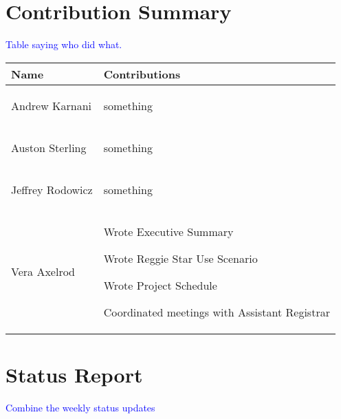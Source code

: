 \documentclass[11pt]{article}
\newenvironment{packed_itemize}{
\begin{itemize}
  \setlength{\itemsep}{1pt}
  \setlength{\parskip}{0pt}
  \setlength{\parsep}{0pt}
}{\end{itemize}}
\begin{document}
\section{Contribution Summary} %
\textcolor{blue}{Table saying who did what.}

\begin{table}
\centering %
\begin{tabular}{|p{1.4in}|p{4in}|}
\hline
\textbf{Name}     & \textbf{Contributions} \\
\hline\hline
 Andrew Karnani
	& 
	 \begin{packed_itemize} 
	\vspace{-0.15in}
		\item something
	\end{packed_itemize}
	\vspace{-0.4in}
\\
\hline
 Auston Sterling
	& 
	 \begin{packed_itemize} 
	\vspace{-0.15in}
		\item something
	\end{packed_itemize}
	\vspace{-0.4in}
\\
\hline
Jeffrey Rodowicz
	& 
	 \begin{packed_itemize} 
	\vspace{-0.15in}
		\item something
	\end{packed_itemize}
	\vspace{-0.4in}
\\
\hline
Vera Axelrod
	& 
	 \begin{packed_itemize} 
	\vspace{-0.15in}
		\item Wrote Executive Summary 
		\item Wrote Reggie Star Use Scenario
		\item Wrote Project Schedule
		\item Coordinated meetings with Assistant Registrar
	\end{packed_itemize}
	\vspace{-0.4in}
\\
\hline
\end{tabular}
\end{table}


\section{Status Report} %
\textcolor{blue}{Combine the weekly status updates}
\end{document}
